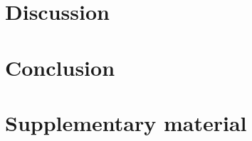 \documentclass{report}
\begin{document}
% 

% 

\chapter{Discussion}


\chapter{Conclusion}


\newpage
\singlespacing



\newpage
\doublespacing
\appendix
\chapter{Supplementary material}

\end{document}

